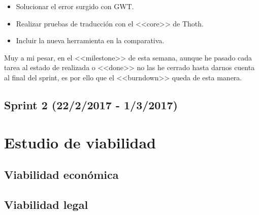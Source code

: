 \begin{itemize}
\item Solucionar el error surgido con GWT.
\item Realizar pruebas de traducción con el <<core>> de Thoth.
\item Incluir la nueva herramienta en la comparativa.
\end{itemize}

Muy a mi pesar, en el <<milestone>> de esta semana, aunque he pasado cada tarea al estado de realizada o <<done>> no las he cerrado hasta darnos cuenta al final del sprint, es por ello que el <<burndown>> queda de esta manera.


\subsection{Sprint 2 (22/2/2017 - 1/3/2017)}

\section{Estudio de viabilidad}

\subsection{Viabilidad económica}

\subsection{Viabilidad legal}



